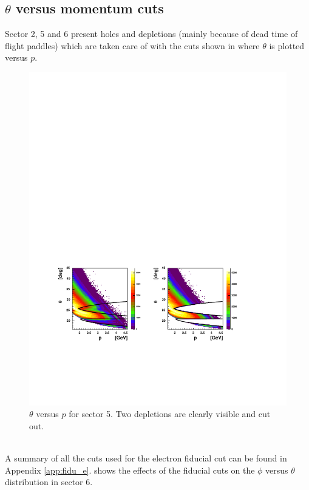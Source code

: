 \subsection{  $\theta$ versus momentum cuts}
Sector 2, 5 and 6 present holes and depletions (mainly because of dead time of flight paddles) 
which are taken care of with the 
cuts shown in  where $\theta$ is plotted versus $p$.
\begin{figure}[h]
 \begin{center}
 \includegraphics[width = 14cm, bb=60 140 500 380]{data_reduction/img/electron_tp5}  
  \caption[$\theta$ versus $p$ for sector 5]
          { $\theta$ versus $p$ for sector 5. Two depletions are clearly visible and cut out.}
 \label{fig:fidu_etp5}
 \end{center}
\end{figure}
\\
A summary of all the cuts used for the electron fiducial cut can be found in Appendix \ref{app:fidu_e}.
 shows the    effects of the fiducial cuts on the $\phi$
versus $\theta$ distribution in sector 6.

